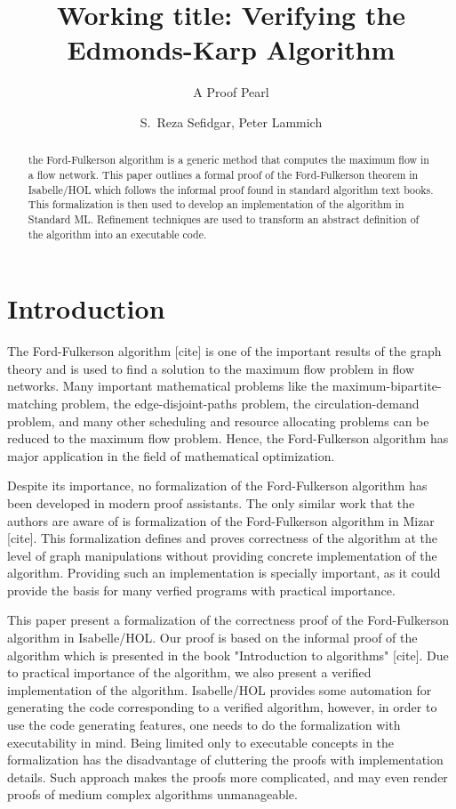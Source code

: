 \documentclass{llncs}
\begin{document}
\title{Working title: Verifying the Edmonds-Karp Algorithm}
\subtitle{A Proof Pearl}

\author{S.~Reza Sefidgar, Peter Lammich}


\maketitle
\begin{abstract}
the Ford-Fulkerson algorithm is a generic method that computes the maximum flow in a flow network. This paper outlines a formal proof of the Ford-Fulkerson theorem in Isabelle/HOL which follows the informal proof found in standard algorithm text books. This formalization is then used to develop an implementation of the algorithm in Standard ML. Refinement techniques are used to transform an abstract definition of the algorithm into an executable code.
\end{abstract}

\section{Introduction}
The Ford-Fulkerson algorithm [cite] is one of the important results of the graph theory and is used to find a solution to the maximum flow problem in flow networks. Many important mathematical problems like the maximum-bipartite-matching problem, the edge-disjoint-paths problem, the circulation-demand problem, and many other scheduling and resource allocating problems can be reduced to the maximum flow problem. Hence, the Ford-Fulkerson algorithm has major application in the field of mathematical optimization.

Despite its importance, no formalization of the Ford-Fulkerson algorithm has been developed in modern proof assistants. The only similar work that the authors are aware of is formalization of the Ford-Fulkerson algorithm in Mizar [cite]. This formalization defines and proves correctness of the algorithm at the level of graph manipulations without providing concrete implementation of the algorithm. Providing such an implementation is specially important, as it could provide the basis for many verfied programs with practical importance.

This paper present a formalization of the correctness proof of the Ford-Fulkerson algorithm in Isabelle/HOL. Our proof is based on the informal proof of the algorithm which is presented in the book "Introduction to algorithms" [cite]. Due to practical importance of the algorithm, we also present a verified implementation of the algorithm. Isabelle/HOL provides some automation for generating the code corresponding to a verified algorithm, however, in order to use the code generating features, one needs to do the formalization with executability in mind. Being limited only to executable concepts in the formalization has the disadvantage of cluttering the proofs with implementation details. Such approach makes the proofs more complicated, and may even render proofs of medium complex algorithms unmanageable.
\end{document}
